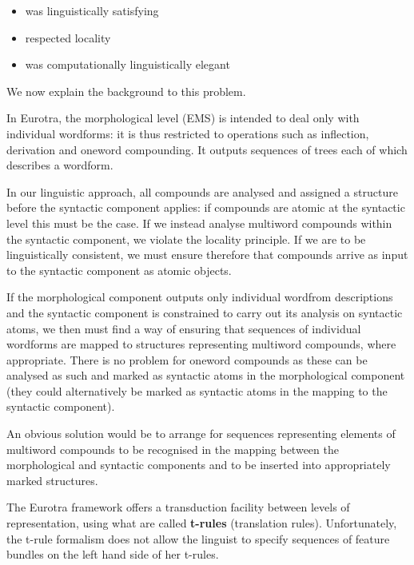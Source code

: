 \begin{itemize}
\item  was linguistically satisfying
\item  respected locality
\item  was computationally linguistically elegant
\end{itemize}

We now explain the background to this problem.

In  Eurotra,  the  morphological level (EMS) is intended to  deal 
only  with  individual  wordforms:   it  is  thus  restricted  to 
operations   such   as   inflection,   derivation   and   oneword 
compounding.   It  outputs  sequences  of  trees  each  of  which 
describes a wordform.
 
In   our  linguistic approach,   all compounds are  analysed  and 
assigned   a  structure before  the syntactic component  applies: 
if  compounds are atomic at the syntactic level this must be  the 
case.  If  we  instead  analyse multiword  compounds  within  the 
syntactic component, we violate the locality principle. If we are 
to   be  linguistically  consistent,  we  must  ensure  therefore  
that 
compounds  arrive as input to the syntactic component  as  atomic 
objects.

If  the morphological component outputs only individual  wordfrom 
descriptions  and  the  syntactic  component  is  constrained  to 
carry  out its analysis on syntactic atoms,  we then must find  a 
way  of  ensuring  that  sequences of  individual  wordforms  are 
mapped  to  structures representing  multiword  compounds,  where 
appropriate.  There is no problem for oneword compounds as  these 
can  be  analysed  as such and marked as syntactic atoms  in  the 
morphological  component (they could alternatively be  marked  as 
syntactic atoms in  the mapping to the syntactic component).

An   obvious   solution  would  be  to  arrange   for   sequences 
representing elements of multiword compounds to be recognised  in 
the  mapping  between the morphological and syntactic  components 
and to be inserted into appropriately marked structures.

The  Eurotra  framework offers a  transduction  facility  between 
levels   of  representation,    using  what  are  called  {\bf
t-rules} 
(translation rules). 
Unfortunately,  the t-rule formalism does not allow the  linguist 
to  specify sequences of feature bundles on the left hand side of 
her t-rules.

